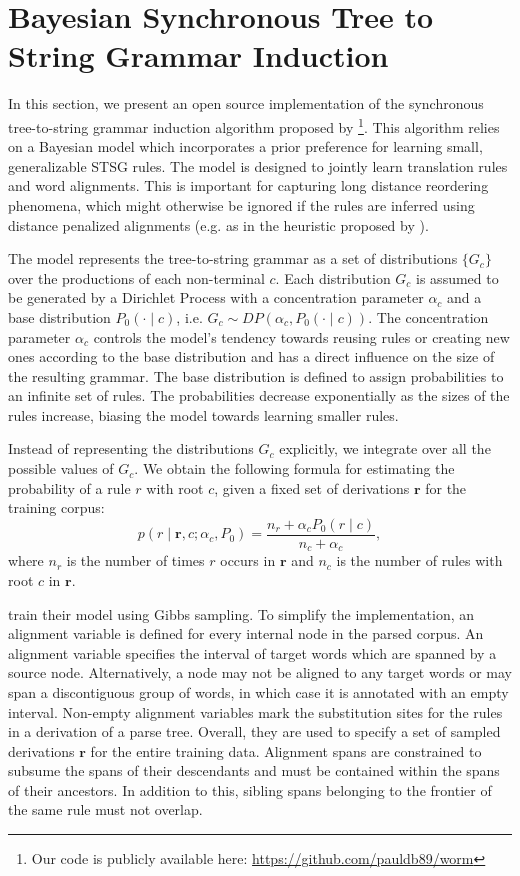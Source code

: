 \documentclass[nofonts]{pbml} %
\begin{document}
\section{Bayesian Synchronous Tree to String Grammar Induction}
\label{sec:bayes}

In this section, we present an open source implementation of the synchronous tree-to-string grammar induction algorithm proposed by \citet{Cohn2009} \footnote{Our code is publicly available here: \url{https://github.com/pauldb89/worm}}. This algorithm relies on a Bayesian model which incorporates a prior preference for learning small, generalizable STSG rules. The model is designed to jointly learn translation rules and word alignments. This is important for capturing long distance reordering phenomena, which might otherwise be ignored if the rules are inferred using distance penalized alignments (e.g. as in the heuristic proposed by \citet{Galley2004}).

The model represents the tree-to-string grammar as a set of distributions $\{G_c\}$ over the productions of each non-terminal $c$. Each distribution $G_c$ is assumed to be generated by a Dirichlet Process with a concentration parameter $\alpha_c$ and a base distribution $P_0(\cdot \mid c)$, i.e. $G_c \sim DP(\alpha_c, P_0(\cdot \mid c))$. The concentration parameter $\alpha_c$ controls the model's tendency towards reusing rules or creating new ones according to the base distribution and has a direct influence on the size of the resulting grammar. The base distribution is defined to assign probabilities to an infinite set of rules. The probabilities decrease exponentially as the sizes of the rules increase, biasing the model towards learning smaller rules.

Instead of representing the distributions $G_c$ explicitly, we integrate over all the possible values of $G_c$. We obtain the following formula for estimating the probability of a rule $r$ with root $c$, given a fixed set of derivations $\textbf{r}$ for the training corpus:
\begin{equation}
p(r \mid \textbf{r}, c; \alpha_c, P_0) = \frac{n_{r} + \alpha_c P_0(r \mid c)}{n_{c} + \alpha_c},
\label{eq:sampling}
\end{equation}
where $n_{r}$ is the number of times $r$ occurs in $\textbf{r}$ and $n_{c}$ is the number of rules with root $c$ in $\textbf{r}$.

\citet{Cohn2009} train their model using Gibbs sampling. To simplify the implementation, an alignment variable is defined for every internal node in the parsed corpus. An alignment variable specifies the interval of target words which are spanned by a source node. Alternatively, a node may not be aligned to any target words or may span a discontiguous group of words, in which case it is annotated with an empty interval. Non-empty alignment variables mark the substitution sites for the rules in a derivation of a parse tree. Overall, they are used to specify a set of sampled derivations $\textbf{r}$ for the entire training data. Alignment spans are constrained to subsume the spans of their descendants and must be contained within the spans of their ancestors. In addition to this, sibling spans belonging to the frontier of the same rule must not overlap.
\end{document}
